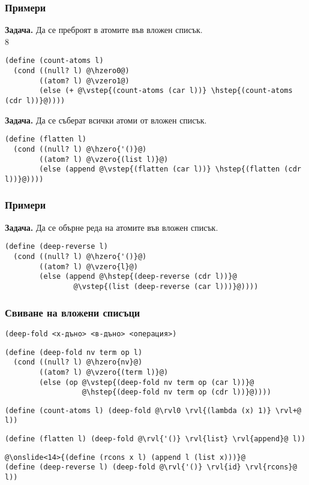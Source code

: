 \documentclass{beamer}
\begin{document}
\begin{frame}[fragile]
  \frametitle{Примери}
  \small
  \textbf{Задача.} Да се преброят в атомите във вложен списък.\\
  8
  \pause
\begin{lstlisting}
(define (count-atoms l)
  (cond ((null? l) @\hzero0@)
        ((atom? l) @\vzero1@)
        (else (+ @\vstep{(count-atoms (car l))} \hstep{(count-atoms (cdr l))}@))))
\end{lstlisting}
  \vspace{1em}
  \pause
  \textbf{Задача.} Да се съберат всички атоми от вложен списък.\\
  \pause
\begin{lstlisting}
(define (flatten l)
  (cond ((null? l) @\hzero{'()}@)
        ((atom? l) @\vzero{(list l)}@)
        (else (append @\vstep{(flatten (car l))} \hstep{(flatten (cdr l))}@))))
\end{lstlisting}
\end{frame}

\begin{frame}[fragile]
  \frametitle{Примери}

  \textbf{Задача.} Да се обърне реда на атомите във вложен списък.\\
  \pause
\begin{lstlisting}
(define (deep-reverse l)
  (cond ((null? l) @\hzero{'()}@)
        ((atom? l) @\vzero{l}@)
        (else (append @\hstep{(deep-reverse (cdr l))}@
                @\vstep{(list (deep-reverse (car l)))}@))))
\end{lstlisting}
\end{frame}

\begin{frame}[fragile]
  \frametitle{Свиване на вложени списъци}

  \tt{(deep-fold }<х-дъно> <в-дъно> <операция>\tt)\\
  \pause
  \onslide<+->
\begin{lstlisting}
(define (deep-fold nv term op l)
  (cond ((null? l) @\hzero{nv}@)
        ((atom? l) @\vzero{(term l)}@)
        (else (op @\vstep{(deep-fold nv term op (car l))}@
                  @\hstep{(deep-fold nv term op (cdr l))}@))))
\end{lstlisting}
  \onslide<+->
\begin{lstlisting}
(define (count-atoms l) (deep-fold @\rvl0 \rvl{(lambda (x) 1)} \rvl+@ l))
\end{lstlisting}
  \onslide<+->
\begin{lstlisting}
(define (flatten l) (deep-fold @\rvl{'()} \rvl{list} \rvl{append}@ l))
\end{lstlisting}
  \onslide<+->
\begin{lstlisting}
@\onslide<14>{(define (rcons x l) (append l (list x)))}@
(define (deep-reverse l) (deep-fold @\rvl{'()} \rvl{id} \rvl{rcons}@ l))
\end{lstlisting}
\end{frame}
\end{document}
